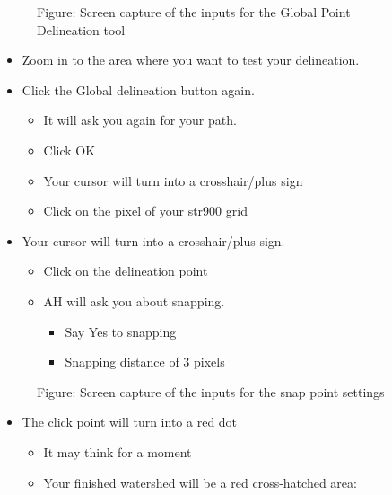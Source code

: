 \documentclass[letterpaper,10pt,english]{sphinxmanual}
\begin{document}
\begin{figure}[htbp]
\centering
\capstart

\noindent{}
\caption{Figure: Screen capture of the inputs for the Global Point Delineation tool}\label{\detokenize{ex_2:id44}}\end{figure}
\begin{itemize}
\item {} 
Zoom in to the area where you want to test your delineation.

\item {} 
Click the Global delineation button again.
\begin{itemize}
\item {} 
It will ask you again for your path.

\item {} 
Click OK

\item {} 
Your cursor will turn into a crosshair/plus sign

\item {} 
Click on the pixel of your str900 grid

\end{itemize}

\item {} 
Your cursor will turn into a crosshair/plus sign.
\begin{itemize}
\item {} 
Click on the delineation point

\item {} 
AH will ask you about snapping.
\begin{itemize}
\item {} 
Say Yes to snapping

\item {} 
Snapping distance of 3 pixels

\end{itemize}

\end{itemize}

\end{itemize}

\begin{figure}[htbp]
\centering
\capstart

\noindent{}
\caption{Figure: Screen capture of the inputs for the snap point settings}\label{\detokenize{ex_2:id45}}\end{figure}
\begin{itemize}
\item {} 
The click point will turn into a red dot
\begin{itemize}
\item {} 
It may think for a moment

\item {} 
Your finished watershed will be a red cross-hatched area:

\end{itemize}

\end{itemize}
\end{document}
